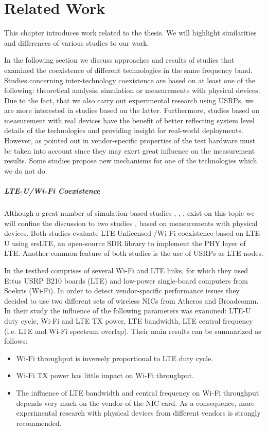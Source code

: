 \chapter{Related Work}
\label{ch:related-work}

This chapter introduces work related to the thesis. We will highlight similarities and differences of various studies to our work. 

In the following section we discuss approaches and results of studies that examined the coexistence of different technologies in the same frequency band. Studies concerning inter-technology coexistence are based on at least one of the following: theoretical analysis, simulation or measurements with physical devices. Due to the fact, that we also carry out experimental research using USRPs, we are more interested in studies based on the latter. Furthermore, studies based on measurement with real devices have the benefit of better reflecting system level details of the technologies and providing insight for real-world deployments. However, as pointed out in \cite{gomezmiguelez16} vendor-specific properties of the test hardware must be taken into account since they may exert great influence on the measurement results. Some studies propose new mechanisms for one of the technologies which we do not do.

\paragraph{LTE-U/Wi-Fi Coexistence}
Although a great number of simulation-based studies \cite{nihtilä13}, \cite{rupasinghe14}, \cite{jeon14}, \cite{cavalcante13} exist on this topic we will confine the discussion to two studies \cite{gomezmiguelez16}, \cite{capretti16} based on measurements with physical devices. Both studies evaluate LTE Unlicensed /Wi-Fi coexistence based on LTE-U using srsLTE, an open-source SDR library to implement the PHY layer of LTE. Another common feature of both studies is the use of USRPs as LTE nodes. 

In \cite{gomezmiguelez16} the testbed comprises of several Wi-Fi and LTE links, for which they used Ettus USRP B210 boards (LTE) and low-power single-board computers from Soekris (Wi-Fi). In order to detect vendor-specific performance issues they decided to use two different sets of wireless NICs from Atheros and Broadcomm. In their study the influence of the following parameters was examined: LTE-U duty cycle, Wi-Fi and LTE TX power, LTE bandwidth, LTE central frequency (i.e. LTE and Wi-Fi spectrum overlap). Their main results can be summarized as follows:
\begin{itemize}
	\item  Wi-Fi throughput is inversely proportional to LTE duty cycle.
	\item  Wi-Fi TX power has little impact on Wi-Fi throughput.
	\item  The influence of LTE bandwidth and central frequency on Wi-Fi throughput depends very much on the vendor of the NIC card. As a consequence, more experimental research with physical devices from different vendors is strongly recommended. 
\end{itemize}
  
